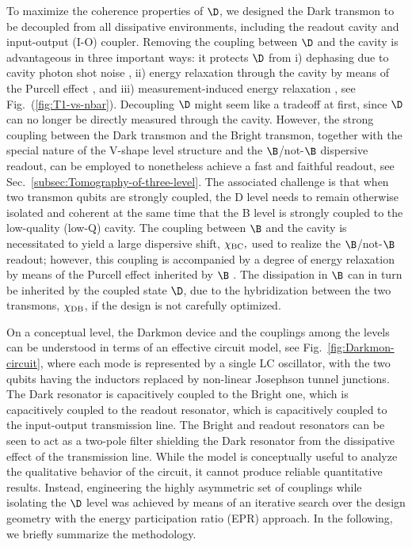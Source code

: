 To maximize the coherence properties of $\D$, we designed the Dark
transmon to be decoupled from all dissipative environments, including
the readout cavity and input-output (I-O) coupler. Removing the coupling
between $\D$ and the cavity is advantageous in three important ways:
it protects $\D$ from i) dephasing due to cavity photon shot noise
\citep{Gambetta2006-dephasing,Wang2019-cav-atten,Wang2018-cav-atten-aps},
ii) energy relaxation through the cavity by means of the Purcell effect
\citep{Gambetta2011-Purcell,Srinivasan2011,Diniz2013,Dumur2015,Novikov2015,Zhang2017,Roy2017-3qubits},
and iii) measurement-induced energy relaxation \citep{Boissonneault2009-Photon-induced-relax,Slichter2016-T1vsNbar},
see Fig.~(\ref{fig:T1-vs-nbar}). Decoupling $\D$ might seem like
a tradeoff at first, since $\D$ can no longer be directly measured
through the cavity. However, the strong coupling between the Dark
transmon and the Bright transmon, together with the special nature
of the V-shape level structure and the $\B$/not-$\B$ dispersive
readout, can be employed to nonetheless achieve a fast and faithful
readout, see Sec.~\ref{subsec:Tomography-of-three-level}. The associated
challenge is that when two transmon qubits are strongly coupled, the
D level needs to remain otherwise isolated and coherent at the same
time that the B level is strongly coupled to the low-quality (low-Q)
cavity. The coupling between $\B$ and the cavity is necessitated
to yield a large dispersive shift, $\chi_{{\rm BC}},$ used to realize
the $\B$/not-$\B$ readout; however, this coupling is accompanied
by a degree of energy relaxation by means of the Purcell effect inherited
by $\B$ \citep{Gambetta2011-Purcell}. The dissipation in $\B$ can
in turn be inherited by the coupled state $\D$, due to the hybridization
between the two transmons, $\chi_{{\rm DB}}$, if the design is not
carefully optimized. 

On a conceptual level, the Darkmon device and the couplings among
the levels can be understood in terms of an effective circuit model,
see Fig.~\ref{fig:Darkmon-circuit}, where each mode is represented
by a single LC oscillator, with the two qubits having the inductors
replaced by non-linear Josephson tunnel junctions. The Dark resonator
is capacitively coupled to the Bright one, which is capacitively coupled
to the readout resonator, which is capacitively coupled to the input-output
transmission line. The Bright and readout resonators can be seen to
act as a two-pole filter shielding the Dark resonator from the dissipative
effect of the transmission line. While the model is conceptually useful
to analyze the qualitative behavior of the circuit, it cannot produce
reliable quantitative results. Instead, engineering the highly asymmetric
set of couplings while isolating the $\D$ level was achieved by means
of an iterative search over the design geometry  with the energy participation
ratio (EPR) approach. In the following, we briefly summarize the methodology. 

